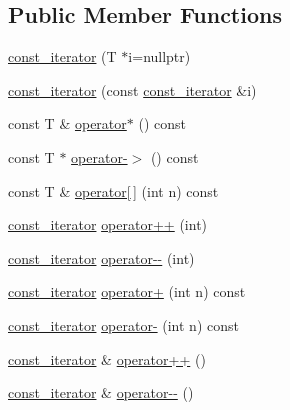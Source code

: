\subsection*{Public Member Functions}
\begin{DoxyCompactItemize}
\item 
\hyperlink{classVector_1_1const__iterator_afa2f13d4f57db06cc18b08d1250108de_afa2f13d4f57db06cc18b08d1250108de}{const\+\_\+iterator} (T $\ast$i=nullptr)
\item 
\hyperlink{classVector_1_1const__iterator_ab513d0d4c5a9f0d66b8300bb39e762be_ab513d0d4c5a9f0d66b8300bb39e762be}{const\+\_\+iterator} (const \hyperlink{classVector_1_1const__iterator}{const\+\_\+iterator} \&i)
\item 
const T \& \hyperlink{classVector_1_1const__iterator_ad93bad8edb6d08eaf7685bd91aea15e5_ad93bad8edb6d08eaf7685bd91aea15e5}{operator$\ast$} () const
\item 
const T $\ast$ \hyperlink{classVector_1_1const__iterator_a627fd21e373252cc9f07620cef64b426_a627fd21e373252cc9f07620cef64b426}{operator-\/$>$} () const
\item 
const T \& \hyperlink{classVector_1_1const__iterator_a595b0bd316e5e6155a56391d41952f22_a595b0bd316e5e6155a56391d41952f22}{operator\mbox{[}$\,$\mbox{]}} (int n) const
\item 
\hyperlink{classVector_1_1const__iterator}{const\+\_\+iterator} \hyperlink{classVector_1_1const__iterator_a67456e47c6bd9b973893d4c367dc6a46_a67456e47c6bd9b973893d4c367dc6a46}{operator++} (int)
\item 
\hyperlink{classVector_1_1const__iterator}{const\+\_\+iterator} \hyperlink{classVector_1_1const__iterator_ab402f46148c6b50a3b967165403912c9_ab402f46148c6b50a3b967165403912c9}{operator-\/-\/} (int)
\item 
\hyperlink{classVector_1_1const__iterator}{const\+\_\+iterator} \hyperlink{classVector_1_1const__iterator_a6b3e3a9f4a0f6817446fc7e0bad4f59c_a6b3e3a9f4a0f6817446fc7e0bad4f59c}{operator+} (int n) const
\item 
\hyperlink{classVector_1_1const__iterator}{const\+\_\+iterator} \hyperlink{classVector_1_1const__iterator_aff6f8ecfef16090d21113ca1bbf77a3c_aff6f8ecfef16090d21113ca1bbf77a3c}{operator-\/} (int n) const
\item 
\hyperlink{classVector_1_1const__iterator}{const\+\_\+iterator} \& \hyperlink{classVector_1_1const__iterator_a2f031ab9801a4c42de40b95b855bacd6_a2f031ab9801a4c42de40b95b855bacd6}{operator++} ()
\item 
\hyperlink{classVector_1_1const__iterator}{const\+\_\+iterator} \& \hyperlink{classVector_1_1const__iterator_a1040c4e1ecb2780da4a94449eef6690f_a1040c4e1ecb2780da4a94449eef6690f}{operator-\/-\/} ()

\end{DoxyCompactItemize}
